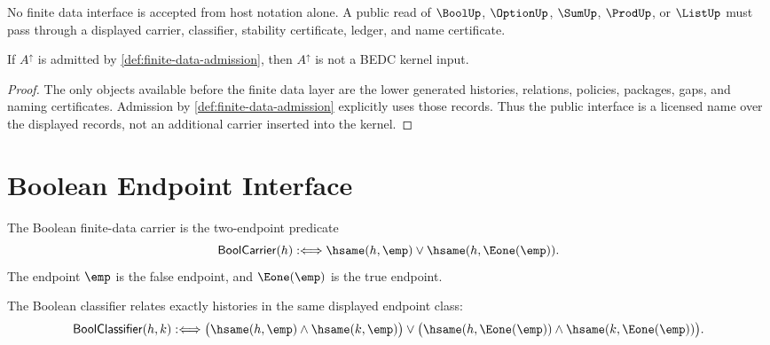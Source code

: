 \begin{principle}
\label{prin:finite-data-certificate-facing}
No finite data interface is accepted from host notation alone.  A public
read of $\BoolUp$, $\OptionUp$, $\SumUp$, $\ProdUp$, or $\ListUp$ must pass
through a displayed carrier, classifier, stability certificate, ledger, and
name certificate.
\end{principle}


\begin{theorem}
\label{thm:finite-data-not-kernel-inputs}
If $A^{\uparrow}$ is admitted by
\autoref{def:finite-data-admission}, then $A^{\uparrow}$ is not a BEDC
kernel input.
\end{theorem}

\begin{proof}
The only objects available before the finite data layer are the lower
generated histories, relations, policies, packages, gaps, and naming
certificates.  Admission by \autoref{def:finite-data-admission} explicitly
uses those records.  Thus the public interface is a licensed name over the
displayed records, not an additional carrier inserted into the kernel.
\end{proof}


\section{Boolean Endpoint Interface}
\label{sec:finite-data-bool-interface}

\begin{definition}
\label{def:finite-data-bool-carrier}
The Boolean finite-data carrier is the two-endpoint predicate
$$
\mathsf{BoolCarrier}(h)
:\Longleftrightarrow
\hsame(h,\emp)
\vee
\hsame(h,\Eone(\emp)).
$$
The endpoint $\emp$ is the false endpoint, and $\Eone(\emp)$ is the true
endpoint.
\end{definition}

\begin{definition}
\label{def:finite-data-bool-classifier}
The Boolean classifier relates exactly histories in the same displayed
endpoint class:
$$
\mathsf{BoolClassifier}(h,k)
:\Longleftrightarrow
\bigl(\hsame(h,\emp)\wedge\hsame(k,\emp)\bigr)
\vee
\bigl(\hsame(h,\Eone(\emp))\wedge\hsame(k,\Eone(\emp))\bigr).
$$
\end{definition}

